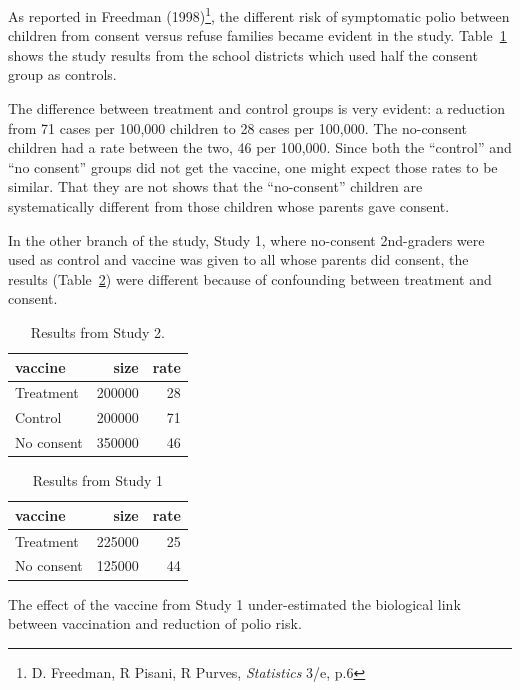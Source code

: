 \documentclass[
  letterpaper,
  DIV=11,
  numbers=noendperiod,
  oneside]{scrreprt}
\begin{document}
{\begin{footnotesize}
As reported in Freedman (1998)\footnote{D. Freedman, R Pisani, R Purves,
  \emph{Statistics} 3/e, p.6}, the different risk of symptomatic polio
between children from consent versus refuse families became evident in
the study. Table~\ref{tbl-polio1} shows the study results from the
school districts which used half the consent group as controls.

The difference between treatment and control groups is very evident: a
reduction from 71 cases per 100,000 children to 28 cases per 100,000.
The no-consent children had a rate between the two, 46 per 100,000.
Since both the ``control'' and ``no consent'' groups did not get the
vaccine, one might expect those rates to be similar. That they are not
shows that the ``no-consent'' children are systematically different from
those children whose parents gave consent.

In the other branch of the study, Study 1, where no-consent 2nd-graders
were used as control and vaccine was given to all whose parents did
consent, the results (Table~\ref{tbl-polio2}) were different because of
confounding between treatment and consent.

\hypertarget{tbl-polio1}{}
\ttfamily 
\begin{table}
\caption{\label{tbl-polio1}Results from Study 2. }\tabularnewline

\centering
\begin{tabular}{lrr}
\toprule
vaccine & size & rate\\
\midrule
Treatment & 200000 & 28\\
Control & 200000 & 71\\
No consent & 350000 & 46\\
\bottomrule
\end{tabular}
\end{table}
 \normalfont
\bigskip

\hypertarget{tbl-polio2}{}
\ttfamily 
\begin{table}
\caption{\label{tbl-polio2}Results from Study 1 }\tabularnewline

\centering
\begin{tabular}{lrr}
\toprule
vaccine & size & rate\\
\midrule
Treatment & 225000 & 25\\
No consent & 125000 & 44\\
\bottomrule
\end{tabular}
\end{table}
 \normalfont
\bigskip

The effect of the vaccine from Study 1 under-estimated the biological
link between vaccination and reduction of polio risk.


\end{footnotesize}}
\end{document}
